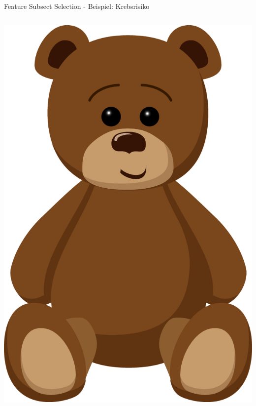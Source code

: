 \documentclass[xcolor=dvipsnames]{beamer}
\begin{document}
    \begin{frame}{Feature Subsect Selection - Beispiel: Krebsrisiko}
        \begin{columns}
            \begin{column}{0.3\textwidth}
                    \center
                     \includegraphics[width=(\textwidth / 3)]{img/teddy.png}

\end{column}
\end{columns}
\end{frame}
\end{document}
